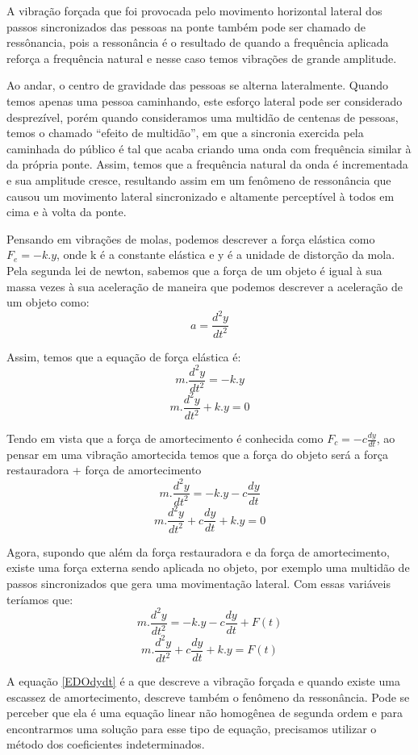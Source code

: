 \documentclass[12pt]{article}
\begin{document}
A vibração forçada que foi provocada pelo movimento horizontal lateral dos passos sincronizados das pessoas na ponte também pode ser 
chamado de ressônancia, pois a ressonância  é o resultado de quando a frequência aplicada reforça a frequência natural e nesse caso temos vibrações de grande amplitude.

Ao andar, o centro de gravidade das pessoas se alterna lateralmente. 
Quando temos apenas uma pessoa caminhando, este esforço lateral pode ser considerado 
desprezível, porém quando consideramos uma multidão de centenas de pessoas, temos o 
chamado “efeito de multidão”, em que a sincronia exercida pela caminhada do público é tal 
que acaba criando uma onda com frequência similar à da própria ponte. Assim, 
temos que a frequência natural da onda é incrementada e sua amplitude cresce, 
resultando assim em um fenômeno de ressonância que causou um movimento lateral 
sincronizado e altamente perceptível à todos em cima e à volta da ponte.

Pensando em vibrações de molas, podemos descrever a força elástica como $F_e = -k.y$, onde k é a
constante elástica e y é a unidade de distorção da mola. Pela segunda lei de newton, sabemos que a força de um
objeto é igual à sua massa vezes à sua aceleração de maneira que podemos descrever a aceleração de um objeto como:
\[ a = \frac{d^2 y}{d t^2} \]

Assim, temos que a equação de força elástica é:
\[ m.\frac{d^2 y}{d t^2} = -k.y \]
\[ m.\frac{d^2 y}{d t^2} + k.y = 0\]

Tendo em vista que a força de amortecimento é conhecida como $F_c = -c\frac{dy}{dt}$,
ao pensar em uma vibração amortecida temos que a força do objeto será a 
força restauradora + força de amortecimento
\[ m.\frac{d^2 y}{d t^2} = -k.y - c\frac{dy}{dt}\]
\[ m.\frac{d^2 y}{d t^2} + c\frac{dy}{dt}  + k.y = 0\]

Agora, supondo que além da força restauradora e da força de amortecimento, existe uma força externa sendo aplicada no
objeto, por exemplo uma multidão de passos sincronizados que gera uma movimentação lateral.
Com essas variáveis teríamos que:
\[ m.\frac{d^2 y}{d t^2} = -k.y - c\frac{dy}{dt} + F(t)\] 
\begin{equation}
    \label{EDOdydt}
    m.\frac{d^2 y}{d t^2} + c\frac{dy}{dt}  + k.y = F(t)
\end{equation}

A equação \ref{EDOdydt} é a que descreve a vibração forçada e quando existe uma escassez de amortecimento,
descreve também o fenômeno da ressonância.
Pode se perceber que ela é uma equação linear não homogênea de segunda ordem e para encontrarmos 
uma solução para esse tipo de equação, precisamos utilizar o método dos coeficientes indeterminados.
\end{document}
